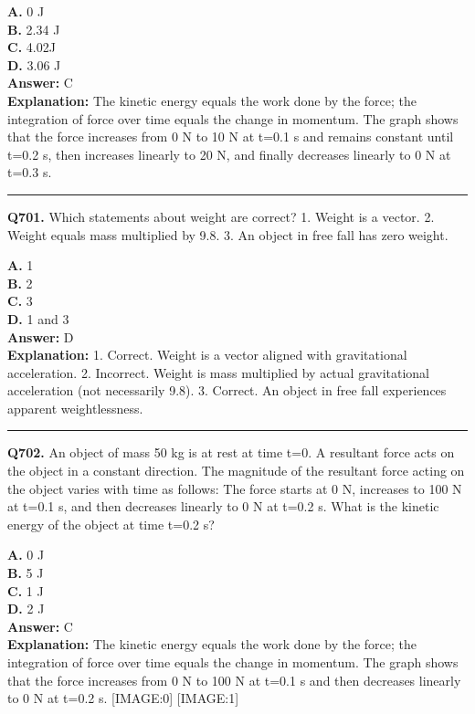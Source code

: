 \documentclass[12pt]{article}
\begin{document}
\textbf{A.} 0 J \\
\textbf{B.} 2.34 J \\
\textbf{C.} 4.02J \\
\textbf{D.} 3.06 J \\

\textbf{Answer:} C \\
\textbf{Explanation:} The kinetic energy equals the work done by the force; the integration of force over time equals the change in momentum. The graph shows that the force increases from 0 N to 10 N at t=0.1 s and remains constant until t=0.2 s, then increases linearly to 20 N, and finally decreases linearly to 0 N at t=0.3 s.

\hrule
\vspace{1em}


\noindent
\textbf{Q701.} Which statements about weight are correct?
1.
Weight is a vector.
2.
Weight equals mass multiplied by 9.8.
3.
An object in free fall has zero weight.



\textbf{A.} 1 \\
\textbf{B.} 2 \\
\textbf{C.} 3 \\
\textbf{D.} 1 and 3 \\

\textbf{Answer:} D \\
\textbf{Explanation:} 1.
Correct. Weight is a vector aligned with gravitational acceleration.
2.
Incorrect. Weight is mass multiplied by actual gravitational acceleration (not necessarily 9.8).
3.
Correct. An object in free fall experiences apparent weightlessness.

\hrule
\vspace{1em}


\noindent
\textbf{Q702.} An object of mass 50 kg is at rest at time t=0. A resultant force acts on the object in a constant direction. The magnitude of the resultant force acting on the object varies with time as follows:
The force starts at 0 N, increases to 100 N at t=0.1 s, and then decreases linearly to 0 N at t=0.2 s.
What is the kinetic energy of the object at time t=0.2 s?



\textbf{A.} 0 J \\
\textbf{B.} 5 J \\
\textbf{C.} 1 J \\
\textbf{D.} 2 J \\

\textbf{Answer:} C \\
\textbf{Explanation:} The kinetic energy equals the work done by the force; the integration of force over time equals the change in momentum. The graph shows that the force increases from 0 N to 100 N at t=0.1 s and then decreases linearly to 0 N at t=0.2 s.
[IMAGE:0]
[IMAGE:1]
\end{document}
